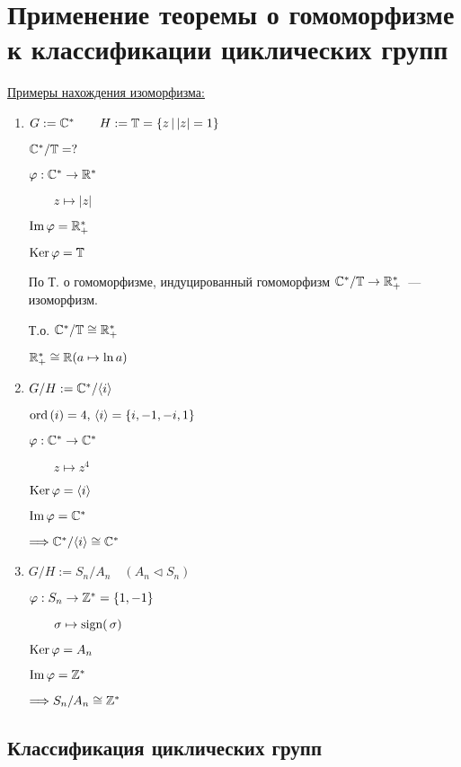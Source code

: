\section{Применение теоремы о гомоморфизме к классификации циклических групп}
\underline{Примеры нахождения изоморфизма:}
\begin{enumerate}
    \item $G := \mathbb{C}^* \qquad H := \mathbb{T} = \{ z \, | \, |z| = 1 \}$
    
    $\mathbb{C}^* / \mathbb{T} = ?$ 

    $\varphi: \mathbb{C}^* \to \mathbb{R}^{*}$

    $\quad \quad z \mapsto |z|$

    $\operatorname{Im} \varphi = \mathbb{R}^{*}_{+}$

    $\operatorname{Ker} \varphi = \mathbb{T}$

    По Т. о гомоморфизме, индуцированный гомоморфизм $\mathbb{C}^{*} / \mathbb{T} \to \mathbb{R}^{*}_{+}$~--- изоморфизм.

    Т.о. $\mathbb{C}^* / \mathbb{T} \cong \mathbb{R}^{*}_+$

    \notice $\mathbb{R}^{*}_+ \cong \mathbb{R} (a \mapsto \ln{a})$

    \item $G / H := \mathbb{C}^* / \langle i \rangle$
    
    $\operatorname{ord}\left( i \right) = 4, \, \langle i \rangle = \{ i, -1, -i, 1 \}$
    
    $\varphi: \mathbb{C}^* \to \mathbb{C}^*$
    
    $\quad \quad z \mapsto z^4$

    $\operatorname{Ker} \varphi = \langle i \rangle$

    $\operatorname{Im} \varphi = \mathbb{C}^*$

    $\Longrightarrow \mathbb{C}^* / \langle i \rangle \cong \mathbb{C}^*$

    \item $G / H := S_n / A_n \quad (A_n \vartriangleleft S_n)$
    
    $\varphi: S_n \to \mathbb{Z}^* = \{ 1, -1 \}$

    $\quad \quad \sigma \mapsto \operatorname{sign (}\sigma)$

    $\operatorname{Ker} \varphi = A_n$

    $\operatorname{Im} \varphi = \mathbb{Z}^*$

    $\Longrightarrow S_n / A_n \cong \mathbb{Z}^{*}$
\end{enumerate}

\subsection*{Классификация циклических групп}

